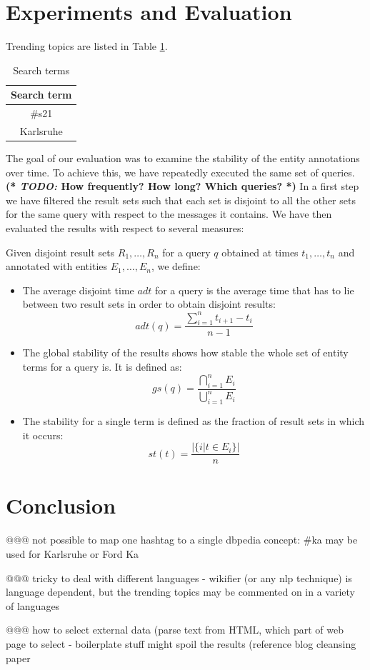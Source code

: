 \documentclass{llncs}
\newcommand{\myremark}[2]{{\textbf{\marginpar{$\parallel$}(* \textit{#1:} #2 *)}}}
\begin{document}
\section{Experiments and Evaluation}
\label{sect:eval}

Trending topics are listed in Table \ref{tbl:terms}.

\begin{table}[ht*]
\centering
\begin{tabular}{ c }
Search term                    \\
\hline
\#s21 \\
Karlsruhe\\
\end{tabular}
\caption{Search terms}\label{tbl:terms}
\end{table}


The goal of our evaluation was to examine the stability of the entity annotations over time. To achieve this, we have repeatedly executed the same set of queries. \myremark{TODO}{How frequently? How long? Which queries?}
In a first step we have filtered the result sets such that each set is disjoint to all the other sets for the same query with respect to the messages it contains. We have then evaluated the results with respect to several measures:

\begin{definition}
Given disjoint result sets $R_1,\ldots,R_n$ for a query $q$ obtained at times $t_1,\ldots,t_n$ and annotated with entities $E_1,\ldots,E_n$, we define:
\begin{itemize}
	\item The average disjoint time $adt$ for a query is the average time that has to lie between two result sets in order to obtain disjoint results: $$adt(q)=\frac{\sum_{i=1}^{n}t_{i+1}-t_i}{n-1}$$
	\item The global stability of the results shows how stable the whole set of entity terms for a query is. It is defined as: $$gs(q)=\frac{\bigcap_{i=1}^{n}E_i}{\bigcup_{i=1}^{n}E_i}$$
	\item The stability for a single term is defined as the fraction of result sets in which it occurs: 
$$st(t)=\frac{|\{i|t\in E_i\}|}{n}$$
\end{itemize}
\end{definition}


\section{Conclusion}
\label{sect:conclusion}

@@@ not possible to map one hashtag to a single dbpedia concept: \#ka may be used for Karlsruhe or Ford Ka

@@@ tricky to deal with different languages - wikifier (or any nlp technique) is language dependent, but the trending topics may be commented on in a variety of languages

@@@ how to select external data (parse text from HTML, which part of web page to select - boilerplate stuff might spoil the results (reference blog cleansing paper



\end{document}
